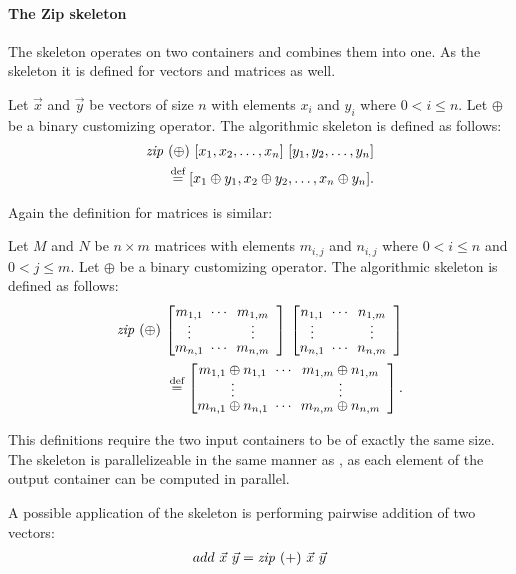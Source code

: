 \paragraph{The Zip skeleton}
The \zip skeleton operates on two containers and combines them into one.
As the \map skeleton it is defined for vectors and matrices as well.
\begin{definition}
  \label{definition:zip}
  Let $\vec{x}$ and $\vec{y}$ be vectors of size $n$ with elements $x_i$ and $y_i$ where $0 < i \leq n$.
  Let $\oplus$ be a binary customizing operator.
  The algorithmic skeleton \zip is defined as follows:
  \begin{equation*}
    \begin{split}
      \text{\textit{zip}}\ (\oplus)\ [x_1, x_2, \dots, x_n]\ [y_1, y_2, \dots, y_n]\\
      \stackrel{\textrm{\scriptsize def}}{=} [x_1 \oplus y_1, x_2 \oplus y_2, \dots, x_n \oplus y_n] .
    \end{split}
  \end{equation*}
\end{definition}
\noindent
Again the definition for matrices is similar:
\begin{definition}
  \label{definition:zip:matrix}
  Let $M$ and $N$ be $n\times m$ matrices with elements $m_{i,j}$ and $n_{i,j}$ where $0 < i \leq n$ and $0 < j \leq m$.
  Let $\oplus$ be a binary customizing operator.
  The algorithmic skeleton \zip is defined as follows:
  \begin{equation*}
    \begin{split}
      \zip\ (\oplus)\ {\DottedMatrix{m_{1,1}}{m_{1,m}}{m_{n,1}}{m_{n,m}}}\
            {\DottedMatrix{n_{1,1}}{n_{1,m}}{n_{n,1}}{n_{n,m}}} \\
      \eqdef \DottedMatrix{m_{1,1} \oplus n_{1,1}}{m_{1,m} \oplus n_{1,m}}{m_{n,1} \oplus n_{n,1}}{m_{n,m} \oplus n_{n,m}} .
    \end{split}
  \end{equation*}
\end{definition}
\noindent
This definitions require the two input containers to be of exactly the same size.
The \zip skeleton is parallelizeable in the same manner as \map, as each element of the output container can be computed in parallel.

A possible application of the \zip skeleton is performing pairwise addition of two vectors:
\begin{align*}
  add\ \vec{x}\ \vec{y} = \text{\textit{zip}}\ (+)\ \vec{x}\ \vec{y}
\end{align*}


